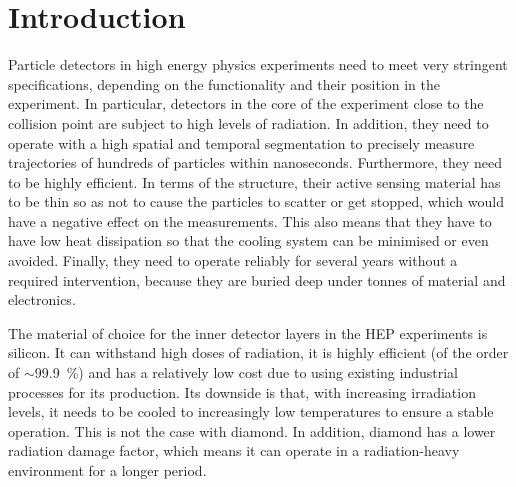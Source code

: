 
\section{Introduction}
Particle detectors in high energy physics experiments need to meet very stringent specifications, depending on the functionality and their position in the experiment. In particular, detectors in the core of the experiment close to the collision point are subject to high levels of radiation. In addition, they need to operate with a high spatial and temporal segmentation to precisely measure trajectories of hundreds of particles within nanoseconds. Furthermore, they need to be highly efficient. In terms of the structure, their active sensing material has to be thin so as not to cause the particles to scatter or get stopped, which would have a negative effect on the measurements. This also means that they have to have low heat dissipation so that the cooling system can be minimised or even avoided. Finally, they need to operate reliably for several years without a required intervention, because they are buried deep under tonnes of material and electronics. 

The material of choice for the inner detector layers in the HEP experiments is silicon. It can withstand high doses of radiation, it is highly efficient (of the order of $\sim$99.9~\%) and has a relatively low cost due to using existing industrial processes for its production. Its downside is that, with increasing irradiation levels, it needs to be cooled to increasingly low temperatures to ensure a stable operation. This is not the case with diamond. In addition, diamond has a lower radiation damage factor, which means it can operate in a radiation-heavy environment for a longer period.

